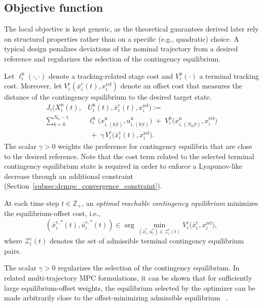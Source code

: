 \documentclass[twocolumn]{autart}
\begin{document}
\subsection{Objective function}
\label{subsec:dcmpc_objective}
The local objective is kept generic, as the theoretical guarantees derived later rely on
structural properties rather than on a specific (e.g., quadratic) choice.
A typical design penalizes deviations of the nominal trajectory from a desired reference and regularizes the selection of the contingency equilibrium.

Let $\ell_i^{\mathrm{n}}(\cdot,\cdot)$ denote a tracking-related stage cost and
$V_i^{\mathrm{n}}(\cdot)$ a terminal tracking cost. Moreover, let
$V_i^{\mathrm{c}}(\bar{x}^{\mathrm{c}}_i(t), x_i^{\mathrm{ref}})$ denote an offset cost that measures
the distance of the contingency equilibrium to the desired target state.
\begin{equation}
\begin{aligned}
J_i\big(X_i^{\mathrm{n}}(t), &U_i^{\mathrm{n}}(t), \bar{x}^{\mathrm{c}}_i(t), x_i^{\mathrm{ref}}\big)
:= \\
\sum_{k=0}^{N_{\mathrm{n}}-1}
&\ell_i^{\mathrm{n}}\!\big(x^{\mathrm{n}}_{i,(k|t)}, u^{\mathrm{n}}_{i,(k|t)}\big)
\;+\;
V_i^{\mathrm{n}}\!\big(x^{\mathrm{n}}_{i,(N_{\mathrm{n}}|t)}, x_i^{\mathrm{ref}}\big) \\
&\;+\;
\gamma\,V_i^{\mathrm{c}}\!\big(\bar{x}^{\mathrm{c}}_i(t), x_i^{\mathrm{ref}}\big).
\end{aligned}
\label{eq:generic_objective}
\end{equation}
The scalar $\gamma>0$ weights the preference for contingency equilibria that are close to the desired reference. Note that the cost term related to the selected terminal contingency equilibrium state is required in order to enforce a Lyapunov-like decrease
through an additional constraint (Section~\ref{subsec:dcmpc_convergence_constraint}).

\begin{definition}
\label{def:opt_reachable_equilibrium}
At each time step $t\in\mathbb{Z}_+$, an \emph{optimal reachable contingency equilibrium} minimizes the equilibrium-offset cost, i.e.,
\[
(\bar x_i^{\mathrm c,\ast}(t),\bar u_i^{\mathrm c,\ast}(t))
\in
\arg\min_{(\bar x_i^{\mathrm c},\bar u_i^{\mathrm c})\in\mathcal Z_i^{\mathrm c}(t)}
V_i^{\mathrm c}\!\big(\bar x_i^{\mathrm c},x_i^{\mathrm{ref}}\big),
\]
where $\mathcal Z_i^{\mathrm c}(t)$ denotes the set of admissible terminal contingency equilibrium pairs.
\end{definition}
\begin{remark}
The scalar $\gamma>0$ regularizes the selection of the contingency equilibrium. In related multi-trajectory MPC formulations, it can be shown that for sufficiently large equilibrium-offset weights, the equilibrium selected by the optimizer can be made arbitrarily close to the offset-minimizing admissible equilibrium ~\cite[Lemma~1]{Saccani2023}.
\end{remark}
\end{document}
